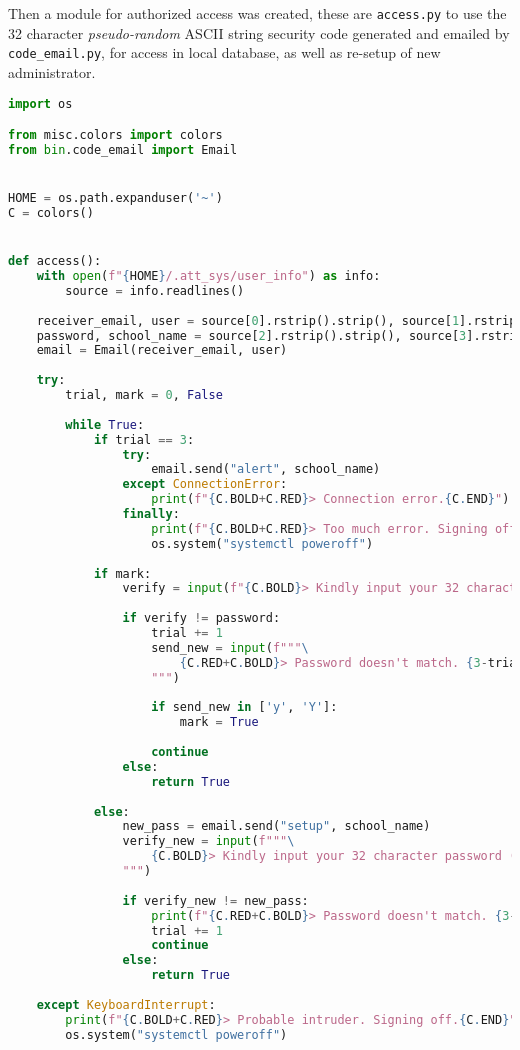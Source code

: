 \documentclass[12pt]{article}
\begin{document}
Then a module for authorized access was created, these are \texttt{access.py} to use the 32 character \textit{pseudo-random} ASCII string security code generated and emailed by \texttt{code\_email.py}, for access in local database, as well as re-setup of new administrator.

\singlespacing
\begin{lstlisting}[language=Python, caption={\texttt{access.py}}]
import os

from misc.colors import colors
from bin.code_email import Email


HOME = os.path.expanduser('~')
C = colors()


def access():
	with open(f"{HOME}/.att_sys/user_info") as info:
		source = info.readlines()
	
	receiver_email, user = source[0].rstrip().strip(), source[1].rstrip().strip() 
	password, school_name = source[2].rstrip().strip(), source[3].rstrip().strip()
	email = Email(receiver_email, user)
	
	try:
		trial, mark = 0, False
		
		while True:                  
			if trial == 3:
				try:
					email.send("alert", school_name)
				except ConnectionError:
					print(f"{C.BOLD+C.RED}> Connection error.{C.END}")
				finally:
					print(f"{C.BOLD+C.RED}> Too much error. Signing off.{C.END}")
					os.system("systemctl poweroff")
				
			if mark:
				verify = input(f"{C.BOLD}> Kindly input your 32 character password (case sensitive {3-trial} left): {C.END}")
				
				if verify != password:
					trial += 1
					send_new = input(f"""\
						{C.RED+C.BOLD}> Password doesn't match. {3-trial} left.{C.END}\n{C.BOLD}Send a new temporary password to your email instead? [y/N]: {C.END}
					""")
					
					if send_new in ['y', 'Y']:
						mark = True
					
					continue
				else:
					return True
				
			else:
				new_pass = email.send("setup", school_name)
				verify_new = input(f"""\
					{C.BOLD}> Kindly input your 32 character password (case sensitive {3-trial} left): {C.END}
				""")
				
				if verify_new != new_pass:
					print(f"{C.RED+C.BOLD}> Password doesn't match. {3-trial} left.{C.END}")
					trial += 1
					continue
				else:
					return True
				
	except KeyboardInterrupt:
		print(f"{C.BOLD+C.RED}> Probable intruder. Signing off.{C.END}")   
		os.system("systemctl poweroff")
\end{lstlisting}
\doublespacing 
\end{document}
